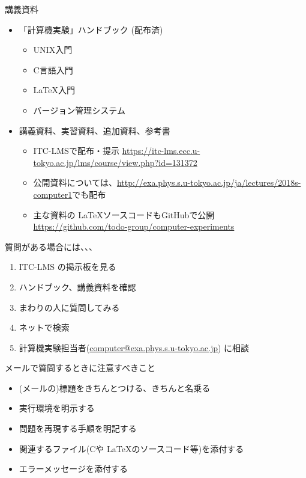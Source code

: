 \begin{frame}[t]{講義資料}
  \begin{itemize}
    \setlength{\itemsep}{1em}
  \item 「計算機実験」ハンドブック (配布済)
    \begin{itemize}
    \item UNIX入門
    \item C言語入門
    \item \LaTeX 入門
    \item バージョン管理システム
    \end{itemize}
  \item 講義資料、実習資料、追加資料、参考書
    \begin{itemize}
    \item ITC-LMSで配布・提示 \url{https://itc-lms.ecc.u-tokyo.ac.jp/lms/course/view.php?id=131372}
    \item 公開資料については、\url{http://exa.phys.s.u-tokyo.ac.jp/ja/lectures/2018s-computer1}でも配布
    \item 主な資料の \LaTeX ソースコードもGitHubで公開 \\
    {\footnotesize \url{https://github.com/todo-group/computer-experiments}}
    \end{itemize}
  \end{itemize}
\end{frame}

\begin{frame}[t]{質問がある場合には、、、}
  \begin{enumerate}
  \item ITC-LMS の掲示板を見る
  \item ハンドブック、講義資料を確認
  \item まわりの人に質問してみる
  \item ネットで検索
  \item 計算機実験担当者(\href{mailto:computer@exa.phys.s.u-tokyo.ac.jp}{computer@exa.phys.s.u-tokyo.ac.jp}) に相談
  \end{enumerate}
  メールで質問するときに注意すべきこと
  \begin{itemize}
  \item (メールの)標題をきちんとつける、きちんと名乗る
  \item 実行環境を明示する
  \item 問題を再現する手順を明記する
  \item 関連するファイル(Cや \LaTeX のソースコード等)を添付する
  \item エラーメッセージを添付する
  \end{itemize}
\end{frame}


